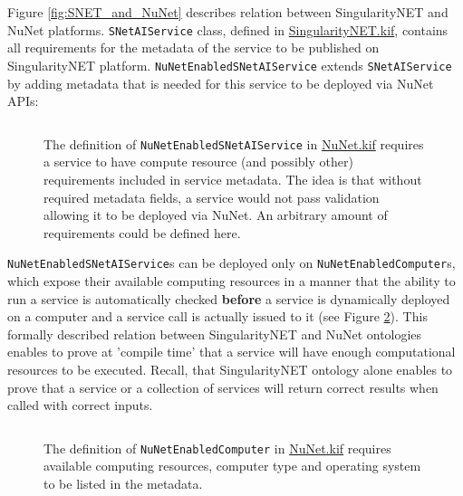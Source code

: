 \documentclass[]{report}
\begin{document}
Figure \ref{fig:SNET_and_NuNet} describes relation between
SingularityNET and NuNet platforms. \texttt{SNetAIService} class, defined in
 \href{https://github.com/singnet/ai-dsl/blob/master/ontology/
SingularityNET.kif}{SingularityNET.kif}, contains all requirements for the
metadata of the service to be published on SingularityNET platform.
\texttt{NuNetEnabledSNetAIService} extends \texttt{SNetAIService} by adding
metadata that is needed for this service to be deployed via NuNet APIs:

\begin{figure}[H]
  \centering
  \inputminted[firstline=4, lastline=11, linenos,tabsize=2,breaklines,
  fontsize=\small]{scm}{../../../ontology/NuNet.kif}
  \captionsetup{width=1\linewidth}
  \vspace{-0.3cm}
  \caption{The definition of \texttt{NuNetEnabledSNetAIService} in
  \href{https://github.com/singnet/ai-dsl/blob/master/ontology/NuNet.kif}{NuNet.kif}
  requires a service to have compute resource (and possibly other) requirements
  included in service metadata. The idea is that without required metadata
  fields, a service would not pass validation allowing it to be deployed via
  NuNet. An arbitrary amount of requirements could be defined here.}
  \label{fig:NuNetEnabledAIService_metadata_requirements}
\end{figure}

\texttt{NuNetEnabledSNetAIService}s can be deployed only on
\texttt{NuNetEnabledComputer}s, which expose their available computing resources
in a manner that the ability to run a service is automatically checked
\textbf{before} a service is dynamically deployed on a computer and a service
call is actually issued to it (see Figure
\ref{fig:NuNetEnabledComputer_requirements}). This formally described relation
between SingularityNET and NuNet ontologies enables to prove at 'compile time'
that a service will have enough computational  resources to be executed. Recall,
that SingularityNET ontology alone enables to  prove that a service or a
collection of services will return correct results when  called with correct
inputs.

\begin{figure}[H]
  \centering
  \inputminted[firstline=13, lastline=31, linenos,tabsize=2,breaklines,
  fontsize=\small]{scm}{../../../ontology/NuNet.kif}
  \captionsetup{width=1\linewidth}
  \vspace{-0.3cm}
  \caption{The definition of \texttt{NuNetEnabledComputer} in
  \href{https://github.com/singnet/ai-dsl/blob/master/ontology/NuNet.kif}{NuNet.kif}
  requires available computing resources, computer type and operating system to
  be listed in the metadata.}
  \label{fig:NuNetEnabledComputer_requirements}
\end{figure}
\end{document}
